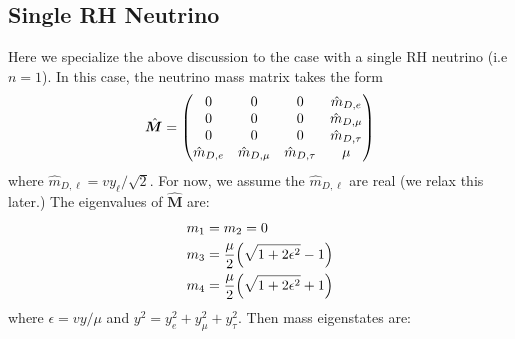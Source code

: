 \documentclass[a4paper,11pt]{article} \pdfoutput=1
\begin{document}
\subsection{Single RH Neutrino}
Here we specialize the above discussion to the case with a single RH neutrino (i.e
\(n=1\)). In this case, the neutrino mass matrix takes the form
\begin{align}
	\hat{\bm{M}} = \mqty(
	0             & 0               & 0                & \hat{m}_{D,e}    \\
	0             & 0               & 0                & \hat{m}_{D,\mu}  \\
	0             & 0               & 0                & \hat{m}_{D,\tau} \\
	\hat{m}_{D,e} & \hat{m}_{D,\mu} & \hat{m}_{D,\tau} & \mu              \\
	)
\end{align}
where \(\hat{m}_{D,\ell} = v y_{\ell}/\sqrt{2}\). For now, we assume the \(\hat{m}_{D,\ell}\)
are real (we relax this later.) The eigenvalues of
\(\hat{\bm{M}}\) are:
\begin{align}
	m_{1} & = m_{2} = 0                                     \\
	m_{3} & = \frac{\mu}{2}\qty(\sqrt{1 + 2\epsilon^{2}}-1) \\
	m_{4} & = \frac{\mu}{2}\qty(\sqrt{1 + 2\epsilon^{2}}+1)
\end{align}
where \(\epsilon=vy/\mu\) and \(y^{2}=y_{e}^{2}+y_{\mu}^{2}+y_{\tau}^{2}\).
Then mass eigenstates are:
\end{document}
